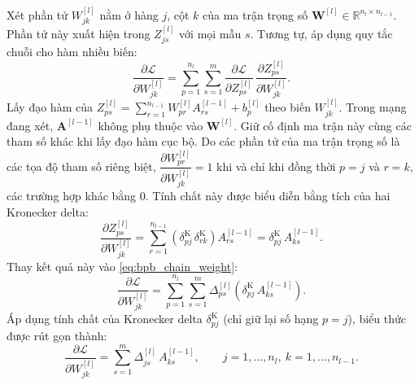 Xét phần tử $W_{jk}^{[l]}$ nằm ở hàng $j$, cột $k$ của ma trận trọng số $\mathbf{W}^{[l]} \in \mathbb{R}^{n_l \times n_{l-1}}$. Phần tử này xuất hiện trong $Z_{js}^{[l]}$ với mọi mẫu $s$. Tương tự, áp dụng quy tắc chuỗi cho hàm nhiều biến:
\begin{equation}
\frac{\partial\mathcal{L}}{\partial W_{jk}^{[l]}} = \sum_{p=1}^{n_l}\sum_{s=1}^{m} \frac{\partial\mathcal{L}}{\partial Z_{ps}^{[l]}}\,\frac{\partial Z_{ps}^{[l]}}{\partial W_{jk}^{[l]}}.
\label{eq:bpb_chain_weight}
\end{equation}
Lấy đạo hàm của $Z_{ps}^{[l]} = \sum_{r=1}^{n_{l-1}} W_{pr}^{[l]}A_{rs}^{[l-1]} + b_p^{[l]}$ theo biến $W_{jk}^{[l]}$. Trong mạng đang xét, $\mathbf{A}^{[l-1]}$ không phụ thuộc vào $\mathbf{W}^{[l]}$. Giữ cố định ma trận này cùng các tham số khác khi lấy đạo hàm cục bộ. Do các phần tử của ma trận trọng số là các tọa độ tham số riêng biệt, $\dfrac{\partial W_{pr}^{[l]}}{\partial W_{jk}^{[l]}} = 1$ khi và chỉ khi đồng thời $p = j$ và $r = k$, các trường hợp khác bằng $0$. Tính chất này được biểu diễn bằng tích của hai Kronecker delta:
\begin{equation}
\frac{\partial Z_{ps}^{[l]}}{\partial W_{jk}^{[l]}} = \sum_{r=1}^{n_{l-1}} \left(\delta^{\mathrm{K}}_{pj}\,\delta^{\mathrm{K}}_{rk}\right) A_{rs}^{[l-1]} = \delta^{\mathrm{K}}_{pj}\,A_{ks}^{[l-1]}.
\end{equation}
Thay kết quả này vào \eqref{eq:bpb_chain_weight}:
\begin{equation}
\frac{\partial\mathcal{L}}{\partial W_{jk}^{[l]}} = \sum_{p=1}^{n_l}\sum_{s=1}^{m} \Delta_{ps}^{[l]}\left(\delta^{\mathrm{K}}_{pj}\,A_{ks}^{[l-1]}\right).
\end{equation}
Áp dụng tính chất của Kronecker delta $\delta^{\mathrm{K}}_{pj}$ (chỉ giữ lại số hạng $p = j$), biểu thức được rút gọn thành:
\begin{equation}
\frac{\partial\mathcal{L}}{\partial W_{jk}^{[l]}} = \sum_{s=1}^{m}\Delta_{js}^{[l]}\,A_{ks}^{[l-1]}, \qquad j = 1,\dots,n_l,\ k = 1,\dots,n_{l-1}.
\label{eq:bpb_weight_component}
\end{equation}
 
